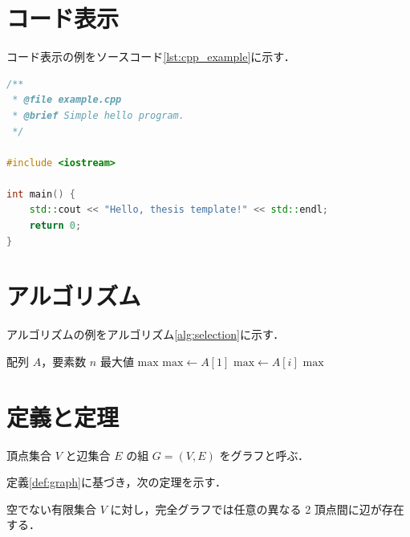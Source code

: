 \section{コード表示}
\label{sec:code}

コード表示の例をソースコード\ref{lst:cpp_example}に示す．

\begin{lstlisting}[language=C++, caption={C++ の例}, label={lst:cpp_example}]
/**
 * @file example.cpp
 * @brief Simple hello program.
 */

#include <iostream>

int main() {
    std::cout << "Hello, thesis template!" << std::endl;
    return 0;
}
\end{lstlisting}

\section{アルゴリズム}
\label{sec:algorithm}

アルゴリズムの例をアルゴリズム\ref{alg:selection}に示す．

\begin{algorithm}[H]
    \caption{最大値の探索}
    \label{alg:selection}
    \begin{algorithmic}[1]
        \Require 配列 $A$，要素数 $n$
        \Ensure 最大値 $\mathrm{max}$
        \State $\mathrm{max} \gets A[1]$
                \State $\mathrm{max} \gets A[i]$
            \EndIf
        \EndFor
        \State \Return $\mathrm{max}$
    \end{algorithmic}
\end{algorithm}

\section{定義と定理}
\label{sec:theorem}

\begin{definition}[グラフ]
頂点集合 $V$ と辺集合 $E$ の組 $G = (V, E)$ をグラフと呼ぶ．
\label{def:graph}
\end{definition}

定義\ref{def:graph}に基づき，次の定理を示す．

\begin{theorem}
空でない有限集合 $V$ に対し，完全グラフでは任意の異なる 2 頂点間に辺が存在する．
\label{thm:complete_graph}
\end{theorem}

